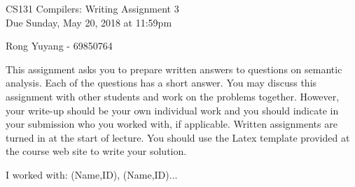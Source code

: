 \documentclass[10pt]{article}
\begin{document}
\begin{center}
\Large CS131 Compilers: Writing Assignment 3\\Due Sunday, May 20, 2018 at 11:59pm
\end{center}

\begin{center}
\LARGE Rong Yuyang - 69850764
\end{center}

This assignment asks you to prepare written answers to questions on
semantic analysis. Each of the questions has a short answer. You
may discuss this assignment with other students and work on the problems
together. However, your write-up should be your own individual work
and you should indicate in your submission who you worked with, if applicable.
Written assignments are turned in at the start of lecture.
You should use the Latex template provided
at the course web site to write your solution.


\begin{center}
I worked with: (Name,ID), (Name,ID)...
\end{center}
\end{document}
